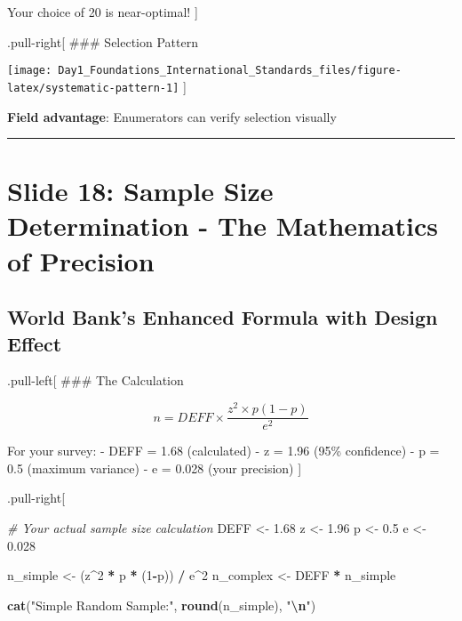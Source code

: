 \documentclass[
]{article}
\newenvironment{Shaded}{\begin{snugshade}}{\end{snugshade}}
\newcommand{\CommentTok}[1]{\textcolor[rgb]{0.56,0.35,0.01}{\textit{#1}}}
\newcommand{\DecValTok}[1]{\textcolor[rgb]{0.00,0.00,0.81}{#1}}
\newcommand{\FloatTok}[1]{\textcolor[rgb]{0.00,0.00,0.81}{#1}}
\newcommand{\FunctionTok}[1]{\textcolor[rgb]{0.13,0.29,0.53}{\textbf{#1}}}
\newcommand{\NormalTok}[1]{#1}
\newcommand{\OtherTok}[1]{\textcolor[rgb]{0.56,0.35,0.01}{#1}}
\newcommand{\SpecialCharTok}[1]{\textcolor[rgb]{0.81,0.36,0.00}{\textbf{#1}}}
\newcommand{\StringTok}[1]{\textcolor[rgb]{0.31,0.60,0.02}{#1}}
\begin{document}
Your choice of 20 is near-optimal! {]}

.pull-right{[} \#\#\# Selection Pattern

\texttt{[image: Day1\_Foundations\_International\_Standards\_files/figure-latex/systematic-pattern-1]}
{]}

\textbf{Field advantage}: Enumerators can verify selection visually

\begin{center}\rule{0.5\linewidth}{0.5pt}\end{center}

\section{Slide 18: Sample Size Determination - The Mathematics of
Precision}\label{slide-18-sample-size-determination---the-mathematics-of-precision}

\subsection{World Bank's Enhanced Formula with Design
Effect}\label{world-banks-enhanced-formula-with-design-effect}

.pull-left{[} \#\#\# The Calculation

\[n = DEFF \times \frac{z^2 \times p(1-p)}{e^2}\]

For your survey: - DEFF = 1.68 (calculated) - z = 1.96 (95\% confidence)
- p = 0.5 (maximum variance) - e = 0.028 (your precision) {]}

.pull-right{[}

\begin{Shaded}
\begin{Highlighting}[]
\CommentTok{\# Your actual sample size calculation}
\NormalTok{DEFF }\OtherTok{\textless{}{-}} \FloatTok{1.68}
\NormalTok{z }\OtherTok{\textless{}{-}} \FloatTok{1.96}
\NormalTok{p }\OtherTok{\textless{}{-}} \FloatTok{0.5}
\NormalTok{e }\OtherTok{\textless{}{-}} \FloatTok{0.028}

\NormalTok{n\_simple }\OtherTok{\textless{}{-}}\NormalTok{ (z}\SpecialCharTok{\^{}}\DecValTok{2} \SpecialCharTok{*}\NormalTok{ p }\SpecialCharTok{*}\NormalTok{ (}\DecValTok{1}\SpecialCharTok{{-}}\NormalTok{p)) }\SpecialCharTok{/}\NormalTok{ e}\SpecialCharTok{\^{}}\DecValTok{2}
\NormalTok{n\_complex }\OtherTok{\textless{}{-}}\NormalTok{ DEFF }\SpecialCharTok{*}\NormalTok{ n\_simple}

\FunctionTok{cat}\NormalTok{(}\StringTok{"Simple Random Sample:"}\NormalTok{, }\FunctionTok{round}\NormalTok{(n\_simple), }\StringTok{"}\SpecialCharTok{\textbackslash{}n}\StringTok{"}\NormalTok{)}
\end{Highlighting}
\end{Shaded}
\end{document}
